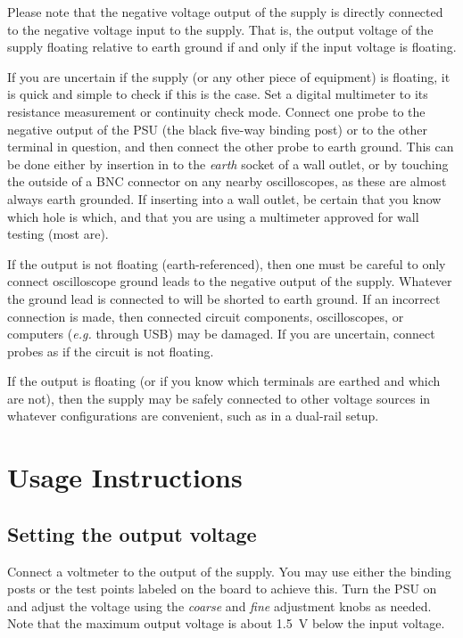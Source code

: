 \documentclass[letterpaper,twocolumn,10pt]{article}
\begin{document}
Please note that the negative voltage output of the supply is directly connected
to the negative voltage input to the supply. That is, the output voltage of the
supply floating relative to earth ground if and only if the input voltage is
floating.

If you are uncertain if the supply (or any other piece of equipment) is
floating, it is quick and simple to check if this is the case. Set a digital
multimeter to its resistance measurement or continuity check mode. Connect one
probe to the negative output of the PSU (the black five-way binding post) or to
the other terminal in question, and then connect the other probe to earth
ground. This can be done either by insertion in to the \emph{earth} socket of a
wall outlet, or by touching the outside of a BNC connector on any nearby
oscilloscopes, as these are almost always earth grounded. If inserting into a
wall outlet, be certain that you know which hole is which, and that you are
using a multimeter approved for wall testing (most are).

If the output is not floating (earth-referenced), then one must be careful to
only connect oscilloscope ground leads to the negative output of the supply.
Whatever the ground lead is connected to will be shorted to earth ground. If an
incorrect connection is made, then connected circuit components, oscilloscopes,
or computers (\textit{e.g.} through USB) may be damaged. If you are uncertain,
connect probes as if the circuit is not floating.

If the output is floating (or if you know which terminals are earthed and which
are not), then the supply may be safely connected to other voltage sources in
whatever configurations are convenient, such as in a dual-rail setup.

\section{Usage Instructions}

\subsection{Setting the output voltage}

Connect a voltmeter to the output of the supply. You may use either the binding
posts or the test points labeled on the board to achieve this. Turn the PSU on
and adjust the voltage using the \emph{coarse} and \emph{fine} adjustment knobs
as needed. Note that the maximum output voltage is about \SI{1.5}{\V} below the
input voltage.
\end{document}
